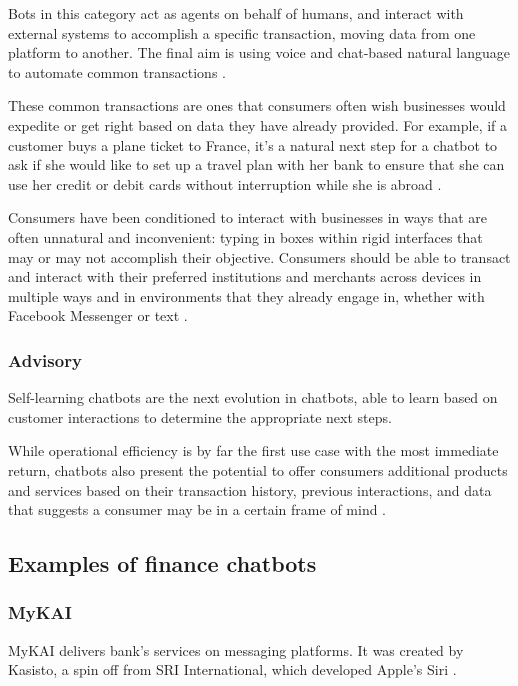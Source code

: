 Bots in this category act as agents on behalf of humans, and interact with external systems to accomplish a specific transaction, moving data from one platform to another.
The final aim is using voice and chat-based natural language to automate common transactions \cite{etlinger2017}.

These common transactions are ones that consumers often wish businesses would expedite or get right based on data they have already provided. For example, if a customer buys a plane ticket to France, it’s a natural next step for a chatbot to ask if she would like to set up a travel plan with her bank to ensure that she can use her credit or debit cards without interruption while she is abroad \cite{etlinger2017}.

Consumers have been conditioned to interact with businesses in ways that are often unnatural and inconvenient: typing in boxes within rigid interfaces that may or may not accomplish their objective. Consumers should be able to transact and interact with their preferred institutions and merchants across devices in multiple ways and in environments that they already engage in, whether with Facebook Messenger or text \cite{etlinger2017}.

\subsubsection{Advisory}
Self-learning chatbots are the next evolution in chatbots, able to learn based on customer interactions to determine the appropriate next steps.

While operational efficiency is by far the first use case with the most immediate return, chatbots also present the potential to offer consumers additional products and services based on their transaction history, previous interactions, and data that suggests a consumer may be in a certain frame of mind \cite{etlinger2017}.


\subsection{Examples of finance chatbots}

\subsubsection{MyKAI}
MyKAI delivers bank's services on messaging platforms. It was created by Kasisto, a spin off from SRI International, which developed Apple's Siri \cite{kasisto}.

